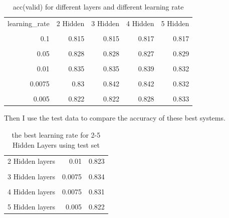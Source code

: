 \documentclass{article}
\begin{document}
\begin{table}[H]
  \centering
  \caption{acc(valid) for different layers and different learning rate}
    \begin{tabular}{rrrrr}
    \toprule
    \multicolumn{1}{l}{learning\_rate} & \multicolumn{1}{l}{2 Hidden} & \multicolumn{1}{l}{3 Hidden} & \multicolumn{1}{l}{4 Hidden} & \multicolumn{1}{l}{5 Hidden} \\
          &       &       &       &  \\
    0.1   & 0.815 & 0.815 & 0.817 & 0.817 \\
          &       &       &       &  \\
    0.05  & 0.828 & 0.828 & 0.827 & 0.829 \\
          &       &       &       &  \\
    0.01  & 0.835 & 0.835 & 0.839 & 0.832 \\
          &       &       &       &  \\
    0.0075 & 0.83  & 0.842 & 0.842 & 0.832 \\
          &       &       &       &  \\
    0.005 & 0.822 & 0.822 & 0.828 & 0.833 \\
    \end{tabular}%
  \label{tab:addlabel}%
\end{table}%




Then I use the test data to compare the accuracy of these best systems.

\begin{table}[H]\label{q1:test}
  \centering
  \caption{the best learning rate for 2-5 Hidden Layers using test set}
    \begin{tabular}{lrr}
    2 Hidden layers & 0.01  & 0.823 \\
          &       &  \\
    3 Hidden layers & 0.0075 & 0.834 \\
          &       &  \\
    4 Hidden layers & 0.0075 & 0.831 \\
          &       &  \\
    5 Hidden layers & 0.005 & 0.822 \\
    \end{tabular}%
  \label{tab:addlabel}%
\end{table}%
\end{document}
